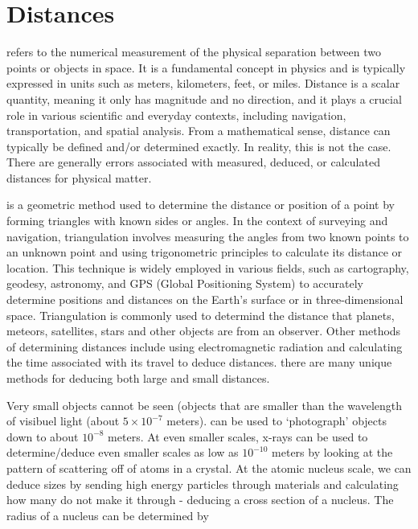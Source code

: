 \section{Distances}

 refers to the numerical measurement of the physical separation between two points or objects in space. It is a fundamental concept in physics and is typically expressed in units such as meters, kilometers, feet, or miles. Distance is a scalar quantity, meaning it only has magnitude and no direction, and it plays a crucial role in various scientific and everyday contexts, including navigation, transportation, and spatial analysis. From a mathematical sense, distance can typically be defined and/or determined exactly. In reality, this is not the case. There are generally errors associated with measured, deduced, or calculated distances for physical matter.  

 is a geometric method used to determine the distance or position of a point by forming triangles with known sides or angles. In the context of surveying and navigation, triangulation involves measuring the angles from two known points to an unknown point and using trigonometric principles to calculate its distance or location. This technique is widely employed in various fields, such as cartography, geodesy, astronomy, and GPS (Global Positioning System) to accurately determine positions and distances on the Earth's surface or in three-dimensional space. Triangulation is commonly used to determind the distance that planets, meteors, satellites, stars and other objects are from an observer. Other methods of determining distances include using electromagnetic radiation and calculating the time associated with its travel to deduce distances. there are many unique methods for deducing both large and small distances.

Very small objects cannot be seen (objects that are smaller than the wavelength of visibuel light (about $5 \times 10^{-7}$ meters).  can be used to `photograph' objects down to about $10^{-8}$ meters. At even smaller scales, x-rays can be used to determine/deduce even smaller scales as low as $10^{-10}$ meters by looking at the pattern of scattering off of atoms in a crystal. At the atomic nucleus scale, we can deduce sizes by sending high energy particles through materials and calculating how many do not make it through - deducing a cross section of a nucleus. The radius of a nucleus can be determined by

